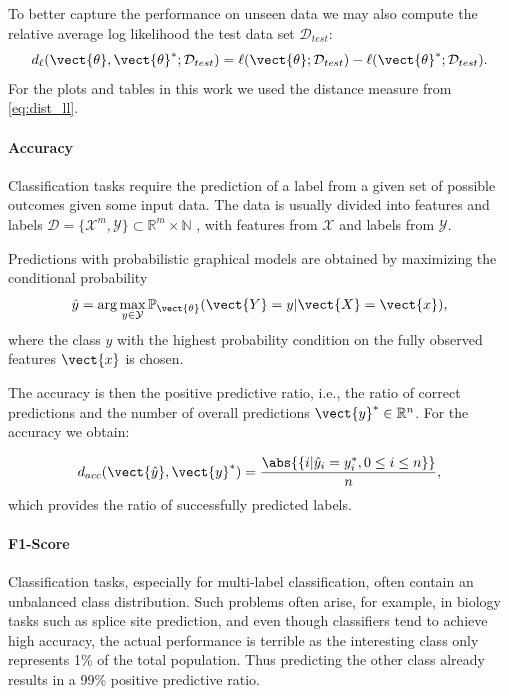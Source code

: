 To better capture the performance on unseen data we may also compute the relative average log likelihood \wrt the test data set $\mathcal{D}_{test}$:
\begin{equation}
    \label{eq:dist_ll_test}
    d_{\ell}(\vect{\theta}, \vect{\theta}^*; \mathcal{D}_{test}) = \ell(\vect{\theta} ; \mathcal{D}_{test}) - \ell(\vect{\theta}^* ; \mathcal{D}_{test}).
\end{equation}
For the plots and tables in this work we used the distance measure from \autoref{eq:dist_ll}.

\paragraph*{Accuracy}
Classification tasks require the prediction of a label from a given set of possible outcomes given some input data.
The data is usually divided into features and labels $\mathcal{D} = \{\mathcal{X}^m, \mathcal{Y}\} \subset \mathbb{R}^m \times \mathbb{N}$ , with features from $\mathcal{X}$ and labels from $\mathcal{Y}$.

Predictions with probabilistic graphical models are obtained by maximizing the conditional probability
\begin{equation}
    \hat{y} = \arg\max_{y \in \mathcal{Y}} \mathbb{P}_{\vect{\theta}}(\vect{Y} = y \lvert \vect{X} = \vect{x}) ,
\end{equation}
where the class $y$ with the highest probability condition on the fully observed features $\vect{x}$ is chosen.

The accuracy is then the positive predictive ratio, i.e., the ratio of correct predictions and the number of overall predictions $\vect{y}^* \in \mathbb{R}^n$.
For the accuracy we obtain:

\begin{equation}
    d_{acc}(\vect{\hat{y}}, \vect{y}^*) = \frac{\abs{\{i \lvert \hat{y}_i = y^*_i, 0 \leq i \leq n\}}}{n}, 
\end{equation}
which provides the ratio of successfully predicted labels. 

\paragraph*{F1-Score}
Classification tasks, especially for multi-label classification, often contain an unbalanced class distribution. 
Such problems often arise, for example, in biology tasks such as splice site prediction\cite{sonnenburg2007accurate}, and even though classifiers tend to achieve high accuracy, the actual performance is terrible as the interesting class only represents 1\% of the total population.
Thus predicting the other class already results in a 99\% positive predictive ratio.

